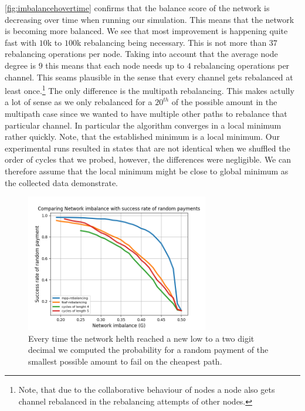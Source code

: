 \documentclass[a4paper]{paper}
\begin{document}
\cref{fig:imbalancehovertime} confirms that the balance score of the network is decreasing over time when running our simulation.
This means that the network is becoming more balanced.
We see that most improvement is happening quite fast with $10$k to $100$k rebalancing being necessary.
This is not more than $37$ rebalancing operations per node.
Taking into account that the average node degree is $9$ this means that each node needs up to $4$ rebalancing operations per channel.  
This seams plausible in the sense that every channel gets rebalanced at least once.\footnote{Note, that due to the collaborative behaviour of nodes a node also gets channel rebalanced in the rebalancing attempts of other nodes.}
The only difference is the multipath rebalancing.
This makes actully a lot of sense as we only rebalanced for a $20^{th}$ of the possible amount in the multipath case since we wanted to have multiple other paths to rebalance that particular channel.
In particular the algorithm converges in a local minimum rather quickly.
Note, that the established minimum is a local minimum. 
Our experimental runs resulted in states that are not identical when we shuffled the order of cycles that we probed, however, the differences were negligible. 
We can therefore assume that the local minimum might be close to global minimum as the collected data demonstrate.

\begin{figure}
 \centering
 \includegraphics[width=8cm]{code/vs/fig/imba_vs_success_rates.png}
 \caption{Every time the network helth reached a new low to a two digit decimal we computed the probability for a random payment of the smallest possible amount to fail on the cheapest path.}
 \label{fig:imba_vs_success}
\end{figure}
\end{document}
